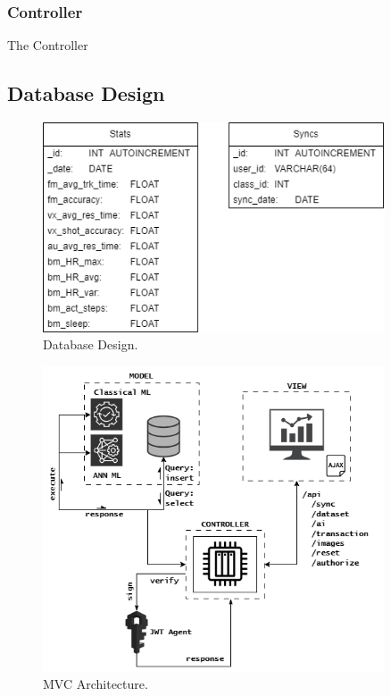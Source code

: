 \subsubsection*{Controller} The Controller
\subsection{Database Design}

\begin{figure}[h!]
    \includegraphics[width=0.9\textwidth]{images/db_schema.png}
    \caption{Database Design.}
    \label{image:databaseDesign}
\end{figure}

\begin{figure}[h!]
    \includegraphics[width=0.9\textwidth]{images/mvc_arch.png}
    \caption{MVC Architecture.}
    \label{image:mvc_arch}
\end{figure}

